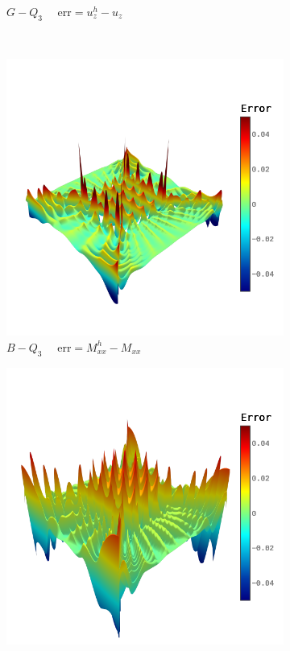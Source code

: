 \begin{figure}[H]
\begin{subfigure}[t]{.45\linewidth}
		\caption{$G-Q_3$ $\quad \text{err} = u_z^h-u_z$}
	\end{subfigure}\\
	\begin{subfigure}[t]{.45\linewidth}
		\center
		\includegraphics[scale=.3,trim={0cm 1.5cm 0cm 1.5cm},clip]{e_Mxx}
		\caption{$B-Q_3$ $\quad \text{err} = M_{xx}^h-M_{xx}$}
	\end{subfigure}
	\begin{subfigure}[t]{.45\linewidth}
		\center
		\includegraphics[scale=.3,trim={0cm 1.5cm 0cm 1.5cm},clip]{g_Mxx}

\end{subfigure}
\end{figure}
